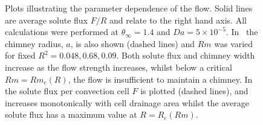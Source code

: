 \documentclass[11pt,twocolumn]{article}
\begin{document}
 
  \begin{figure}[t!]
\centering
\captionsetup[subfigure]{position=top,singlelinecheck=off,justification=raggedright, aboveskip=-18pt,belowskip=0pt}
\begin{subfigure}[t]{.48\linewidth}
    \centering
    \setlength\figureheight{5cm} 
	\setlength\figurewidth{6.5cm}
	\caption{}
	 
    \label{subfig:Rm-plot}
 \end{subfigure}
 \quad
 \captionsetup[subfigure]{aboveskip=-11pt}
 \begin{subfigure}[t]{.48\linewidth}
    \centering
    \caption{}
    \setlength\figureheight{5cm} 
	\setlength\figurewidth{6.5cm}
	 
    \label{subfig:R-plot}
 \end{subfigure}
 
\setlength{\abovecaptionskip}{-10pt} %
\setlength{\belowcaptionskip}{-7pt} %
 
 \caption{Plots illustrating the parameter dependence of the flow. Solid lines are average solute flux $F/R$ and relate to the right hand axis. All calculations were performed at $\theta_\infty=1.4$ and $Da = 5\times10^{-5}$. In~ the chimney radius, $a$, is also shown (dashed lines) and $Rm$ was varied for fixed $R^2=0.048, 0.68, 0.09$. Both solute flux and chimney width increase as the flow strength increases, whilst below a critical $Rm = Rm_c(R)$, the flow is insufficient to maintain a chimney. In~ the solute flux per convection cell $F$ is plotted (dashed lines), and increases monotonically with cell drainage area whilst the average solute flux has a maximum value at $R = R_c(Rm)$.}
 \label{fig:parameter-plots}
 \end{figure}
\end{document}
